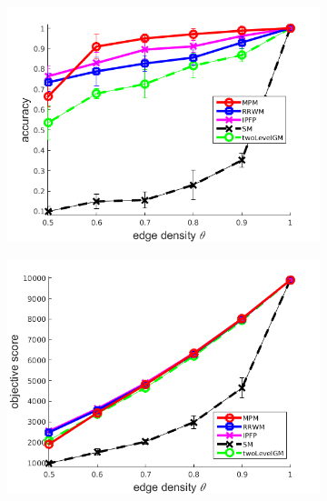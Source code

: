 \begin{figure}[h] 
		\begin{subfigure}[b]{0.3\textwidth}
			\centering
			\includegraphics[scale=0.25]{"chapter3/fig/SyntheticTest/no_descr/Results_v4.3.3/Test4/accuracy_avg10t"} 
		\end{subfigure}%
		\begin{subfigure}[b]{0.3\textwidth}
			\centering
			\includegraphics[scale=0.25]{"chapter3/fig/SyntheticTest/no_descr/Results_v4.3.3/Test4/score_avg10t"} 
		\end{subfigure} 
		\begin{subfigure}[b]{0.3\textwidth}
			\centering

\end{subfigure}
\end{figure}
